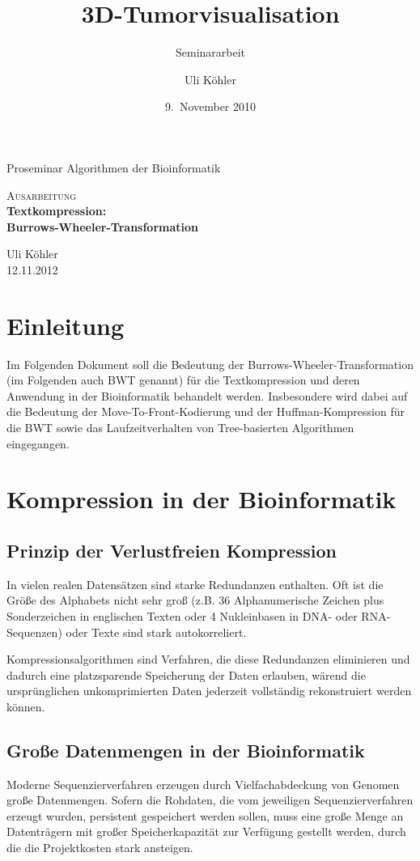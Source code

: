 \documentclass[ngerman,pdftex,paper=A4,DIV=calc,titlepage,12pt]{scrartcl}
\title{3D-Tumorvisualisation}
\subtitle{Seminararbeit}
\author{Uli Köhler}
\date{9.~November 2010}
\newtheorem[L]{boxedDefinition}{Definition}
\begin{document}
\begin{titlepage}
\begin{center}
 Proseminar \glqq Algorithmen der Bioinformatik\grqq
 \end{center}
\vspace{2cm}
\begin{center}
 \large\textsc{Ausarbeitung}\\[5mm]
 {\Huge\centering\bfseries\selectfont Textkompression:\\Burrows-Wheeler-Transformation}\\[2cm]
\begin{center}
  Uli Köhler\\
  12.11.2012
\end{center}
\vspace{2cm}
\end{center}
\tableofcontents
\end{titlepage}
\section{Einleitung}
Im Folgenden Dokument soll die Bedeutung der Burrows-Wheeler-Transformation (im Folgenden auch BWT genannt) für die Textkompression und deren Anwendung in der Bioinformatik behandelt werden. Insbesondere wird dabei auf die Bedeutung der Move-To-Front-Kodierung und der Huffman-Kompression für die BWT sowie das Laufzeitverhalten von Tree-basierten Algorithmen eingegangen.
\section{Kompression in der Bioinformatik}
\subsection{Prinzip der Verlustfreien Kompression}
In vielen realen Datensätzen sind starke Redundanzen enthalten. Oft ist die Größe des Alphabets nicht sehr groß (z.B. 36 Alphanumerische Zeichen plus Sonderzeichen in englischen Texten oder 4 Nukleinbasen in DNA- oder RNA-Sequenzen) oder Texte sind stark autokorreliert.

Kompressionsalgorithmen sind Verfahren, die diese Redundanzen eliminieren und dadurch eine platzsparende Speicherung der Daten erlauben, wärend die ursprünglichen unkomprimierten Daten jederzeit vollständig rekonstruiert werden können.
\subsection{Große Datenmengen in der Bioinformatik}\label{ssec:bigdata-bioinformatics}
Moderne Sequenzierverfahren erzeugen durch Vielfachabdeckung von Genomen große Datenmengen. Sofern die Rohdaten, die vom jeweiligen Sequenzierverfahren erzeugt wurden, persistent gespeichert werden sollen, muss eine große Menge an Datenträgern mit großer Speicherkapazität zur Verfügung gestellt werden, durch die die Projektkosten stark ansteigen.
\end{document}

